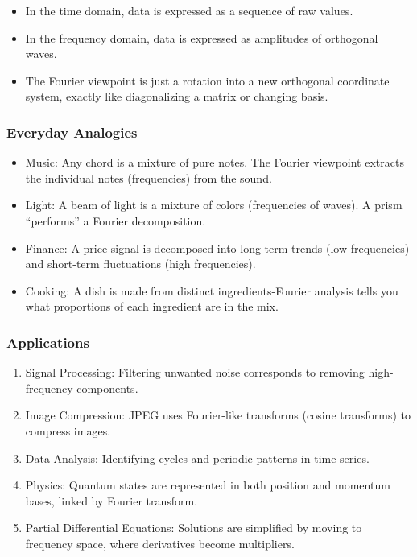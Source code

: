 \documentclass[
  letterpaper,
  DIV=11,
  numbers=noendperiod]{scrreprt}
\providecommand{\tightlist}{%
  \setlength{\itemsep}{0pt}\setlength{\parskip}{0pt}}
\begin{document}
\begin{itemize}
\tightlist
\item
  In the time domain, data is expressed as a sequence of raw values.
\item
  In the frequency domain, data is expressed as amplitudes of orthogonal
  waves.
\item
  The Fourier viewpoint is just a rotation into a new orthogonal
  coordinate system, exactly like diagonalizing a matrix or changing
  basis.
\end{itemize}

\subsubsection{Everyday Analogies}\label{everyday-analogies-75}

\begin{itemize}
\tightlist
\item
  Music: Any chord is a mixture of pure notes. The Fourier viewpoint
  extracts the individual notes (frequencies) from the sound.
\item
  Light: A beam of light is a mixture of colors (frequencies of waves).
  A prism ``performs'' a Fourier decomposition.
\item
  Finance: A price signal is decomposed into long-term trends (low
  frequencies) and short-term fluctuations (high frequencies).
\item
  Cooking: A dish is made from distinct ingredients-Fourier analysis
  tells you what proportions of each ingredient are in the mix.
\end{itemize}

\subsubsection{Applications}\label{applications-41}

\begin{enumerate}
\def\labelenumi{\arabic{enumi}.}
\tightlist
\item
  Signal Processing: Filtering unwanted noise corresponds to removing
  high-frequency components.
\item
  Image Compression: JPEG uses Fourier-like transforms (cosine
  transforms) to compress images.
\item
  Data Analysis: Identifying cycles and periodic patterns in time
  series.
\item
  Physics: Quantum states are represented in both position and momentum
  bases, linked by Fourier transform.
\item
  Partial Differential Equations: Solutions are simplified by moving to
  frequency space, where derivatives become multipliers.
\end{enumerate}
\end{document}
